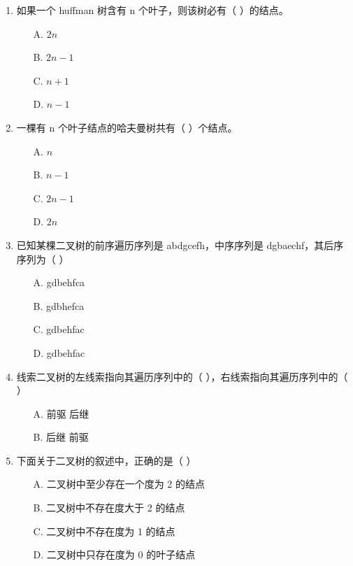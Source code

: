 \documentclass[12pt, a4paper]{article}
\begin{document}
\begin{enumerate}[label=\arabic*.]
	\item 如果一个 huffman 树含有 n 个叶子，则该树必有（ ）的结点。
	      \begin{enumerate}
		      \item[A.] $2n$
		      \item[B.] $2n-1$
		      \item[C.] $n+1$
		      \item[D.] $n-1$
	      \end{enumerate}

	\item 一棵有 n 个叶子结点的哈夫曼树共有（ ）个结点。
	      \begin{enumerate}
		      \item[A.] $n$
		      \item[B.] $n-1$
		      \item[C.] $2n-1$
		      \item[D.] $2n$
	      \end{enumerate}

	\item 已知某棵二叉树的前序遍历序列是 abdgcefh，中序序列是 dgbaechf，其后序序列为（ ）
	      \begin{enumerate}
		      \item[A.] gdbehfca
		      \item[B.] gdbhefca
		      \item[C.] gdbehfac
		      \item[D.] gdbehfac
	      \end{enumerate}

	\item 线索二叉树的左线索指向其遍历序列中的（ ），右线索指向其遍历序列中的（ ）
	      \begin{enumerate}
		      \item[A.] 前驱 后继
		      \item[B.] 后继 前驱
	      \end{enumerate}

	\item 下面关于二叉树的叙述中，正确的是（ ）
	      \begin{enumerate}
		      \item[A.] 二叉树中至少存在一个度为 2 的结点
		      \item[B.] 二叉树中不存在度大于 2 的结点
		      \item[C.] 二叉树中不存在度为 1 的结点
		      \item[D.] 二叉树中只存在度为 0 的叶子结点
	      \end{enumerate}


\end{enumerate}
\end{document}
